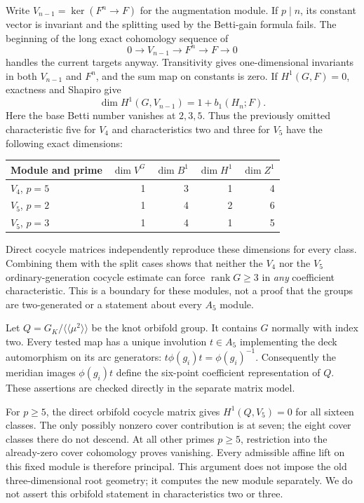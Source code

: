 \documentclass[11pt]{article}
\begin{document}
Write $V_{n-1}=\ker(F^n\to F)$ for the augmentation module. If
$p\mid n$, its constant vector is invariant and the splitting used
by the Betti-gain formula fails. The beginning of the long exact
cohomology sequence of
\[
             0\longrightarrow V_{n-1}\longrightarrow F^n
               \longrightarrow F\longrightarrow0
\]
handles the current targets anyway. Transitivity gives one-dimensional
invariants in both $V_{n-1}$ and $F^n$, and the sum map on constants
is zero. If $H^1(G,F)=0$, exactness and Shapiro give
\[
 \dim H^1(G,V_{n-1})=1+b_1(H_n;F).
\]
Here the base Betti number vanishes at $2,3,5$. Thus the previously
omitted characteristic five for $V_4$ and characteristics two and
three for $V_5$ have the following exact dimensions:
\begin{center}
\begin{tabular}{lrrrr}
\toprule
Module and prime & $\dim V^G$ & $\dim B^1$ & $\dim H^1$ & $\dim Z^1$\\
\midrule
$V_4$, $p=5$ &1&3&1&4\\
$V_5$, $p=2$ &1&4&2&6\\
$V_5$, $p=3$ &1&4&1&5\\
\bottomrule
\end{tabular}
\end{center}
Direct cocycle matrices independently reproduce these dimensions for
every class. Combining them with the split cases shows that neither
the $V_4$ nor the $V_5$ ordinary-generation cocycle estimate can force
$\operatorname{rank}G\ge3$ in \emph{any} coefficient characteristic.
This is a boundary for these modules, not a proof that the groups
are two-generated or a statement about every $A_5$ module.

Let $Q=G_K/\langle\!\langle\mu^2\rangle\!\rangle$ be the knot
orbifold group. It contains $G$ normally with index two. Every tested
map has a unique involution $t\in A_5$ implementing the deck
automorphism on its arc generators: $t\phi(g_i)t=\phi(g_i)^{-1}$.
Consequently the meridian images $\phi(g_i)t$ define the six-point
coefficient representation of $Q$. These assertions are checked
directly in the separate matrix model.

For $p\ge5$, the direct orbifold cocycle matrix gives
$H^1(Q,V_5)=0$ for all sixteen classes. The only possibly nonzero
cover contribution is at seven; the eight cover classes there do
not descend. At all other primes $p\ge5$, restriction into the
already-zero cover cohomology proves vanishing. Every admissible
affine lift on this fixed module is therefore principal. This
argument does not impose the old three-dimensional root geometry;
it computes the new module separately. We do not assert this
orbifold statement in characteristics two or three.
\end{document}
